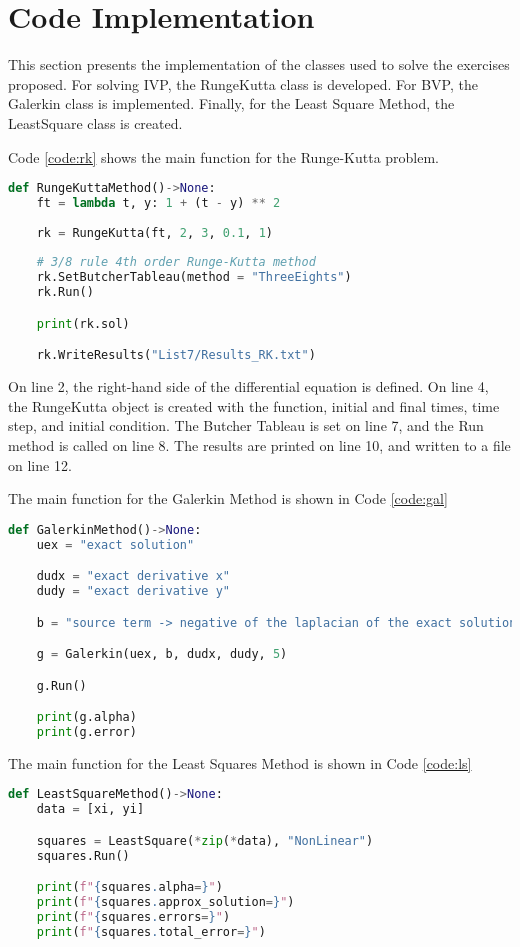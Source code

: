 \section{Code Implementation}\label{sec:code_implementation}
This section presents the implementation of the classes used to solve the exercises proposed. For solving IVP, the RungeKutta class is developed. For BVP, the Galerkin class is implemented. Finally, for the Least Square Method, the LeastSquare class is created.

Code \ref{code:rk} shows the main function for the Runge-Kutta problem. 
\begin{lstlisting}[caption={Main function for the Runge-Kutta problem},label={code:rk},language=python]
def RungeKuttaMethod()->None:
    ft = lambda t, y: 1 + (t - y) ** 2
        
    rk = RungeKutta(ft, 2, 3, 0.1, 1)
    
    # 3/8 rule 4th order Runge-Kutta method
    rk.SetButcherTableau(method = "ThreeEights")
    rk.Run()

    print(rk.sol)

    rk.WriteResults("List7/Results_RK.txt")
\end{lstlisting}

On line 2, the right-hand side of the differential equation is defined. On line 4, the RungeKutta object is created with the function, initial and final times, time step, and initial condition. The Butcher Tableau is set on line 7, and the Run method is called on line 8. The results are printed on line 10, and written to a file on line 12.

The main function for the Galerkin Method is shown in Code \ref{code:gal}
\begin{lstlisting}[caption={Main function for the Galerkin Method},label={code:gal},language=python]
def GalerkinMethod()->None:
    uex = "exact solution"

    dudx = "exact derivative x"
    dudy = "exact derivative y"

    b = "source term -> negative of the laplacian of the exact solution"

    g = Galerkin(uex, b, dudx, dudy, 5)

    g.Run()

    print(g.alpha)
    print(g.error)
\end{lstlisting}

The main function for the Least Squares Method is shown in Code \ref{code:ls}
\begin{lstlisting}[caption={Main function for the Least Squares Method},label={code:ls},language=python]
def LeastSquareMethod()->None:
    data = [xi, yi]

    squares = LeastSquare(*zip(*data), "NonLinear")
    squares.Run()

    print(f"{squares.alpha=}")
    print(f"{squares.approx_solution=}")
    print(f"{squares.errors=}")
    print(f"{squares.total_error=}")
\end{lstlisting}


